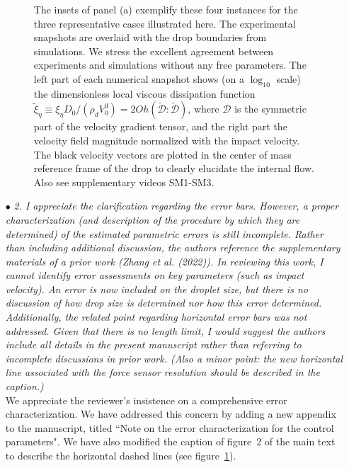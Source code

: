 \documentclass[]{article}
\newcommand{\bb}{\color{black} \normalfont}
\begin{document}
\begin{enumerate}
\begin{figure}
{{		The insets of panel (a) exemplify these four instances for the three representative cases illustrated here. The experimental snapshots are overlaid with the drop boundaries from simulations. 
		We stress the excellent agreement between experiments and simulations without any free parameters.
		The left part of each numerical snapshot shows (on a $\log_{10}$ scale) the dimensionless local viscous dissipation function $\tilde{\xi}_\eta \equiv \xi_\eta D_0/\left(\rho_dV_0^3\right) = 2Oh\left(\boldsymbol{\tilde{\mathcal{D}}:\tilde{\mathcal{D}}}\right)$, where $\boldsymbol{\mathcal{D}}$ is the symmetric part of the velocity gradient tensor, and the right part the velocity field magnitude normalized with the impact velocity. The black velocity vectors are plotted in the center of mass reference frame of the drop to clearly elucidate the internal flow.  Also see supplementary videos SM1-SM3.\bb}}
		\label{fig:summary}
	\end{figure}
	
	
	
	\item[$\bullet$] \textit{2. I appreciate the clarification regarding the error bars. However, a proper characterization (and description of the procedure by which they are determined) of the estimated parametric errors is still incomplete. Rather than including additional discussion, the authors reference the supplementary materials of a prior work (Zhang et al. (2022)). In reviewing this work, I cannot identify error assessments on key parameters (such as impact velocity). An error is now included on the droplet size, but there is no discussion of how drop size is determined nor how this error determined. Additionally, the related point regarding horizontal error bars was not addressed. Given that there is no length limit, I would suggest the authors include all details in the present manuscript rather than referring to incomplete discussions in prior work. (Also a minor point: the new horizontal line associated with the force sensor resolution should be described in the caption.)}\\[1mm]
	
	We appreciate the reviewer's insistence on a comprehensive error characterization. We have addressed this concern by adding a new appendix to the manuscript, titled ``Note on the error characterization for the control parameters". We have also modified the caption of figure~2 of the main text to describe the horizontal dashed lines (see figure~\ref{fig:summary}).  
	

\end{enumerate}
\end{document}
